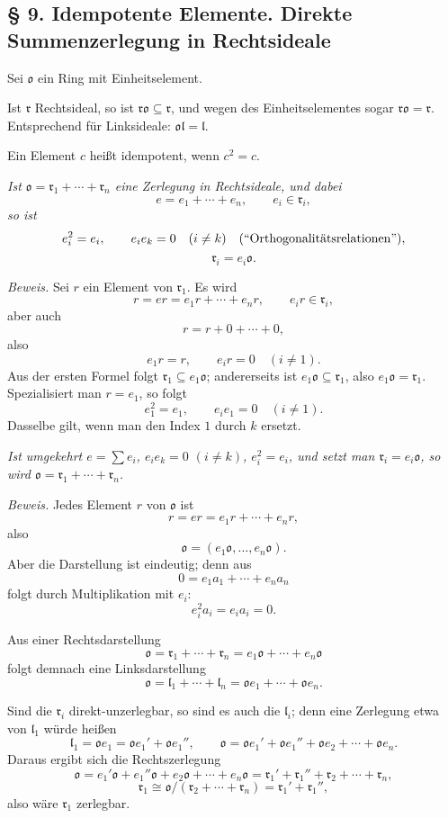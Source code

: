 \documentclass[11pt]{article}
\providecommand{\mo}{\mathfrak{o}}
\providecommand{\ml}{\mathfrak{l}}
\providecommand{\mr}{\mathfrak{r}}
\begin{document}
\subsection*{§ 9. Idempotente Elemente. Direkte Summenzerlegung in Rechtsideale}

Sei $\mo$ ein Ring mit Einheitselement.

Ist $\mr$ Rechtsideal, so ist $\mr\mo\subseteq\mr$, und wegen des Einheitselementes sogar $\mr\mo=\mr$. Entsprechend für Linksideale: $\mo\ml=\ml$.

Ein Element $c$ heißt idempotent, wenn $c^2=c$.

\emph{Ist $\mo=\mr_1+\cdots+\mr_n$ eine Zerlegung in Rechtsideale, und dabei}
\[
        e=e_1+\cdots+e_n,
        \qquad e_i\in\mr_i,
\]
\emph{so ist}
\[
        e_i^2=e_i,
        \qquad e_i e_k=0\quad(i\ne k)
        \quad\hbox{(``Orthogonalitätsrelationen'')},
\]
\[
        \mr_i=e_i\mo.
\]

\emph{Beweis.} Sei $r$ ein Element von $\mr_1$. Es wird
\[
        r=er=e_1r+\cdots+e_nr,
        \qquad e_ir\in\mr_i,
\]
aber auch
\[
        r=r+0+\cdots+0,
\]
also
\[
        e_1r=r,
        \qquad e_ir=0\quad(i\ne1).
\]
Aus der ersten Formel folgt $\mr_1\subseteq e_1\mo$; andererseits ist $e_1\mo\subseteq\mr_1$, also $e_1\mo=\mr_1$. Spezialisiert man $r=e_1$, so folgt
\[
        e_1^2=e_1,
        \qquad e_i e_1=0\quad(i\ne1).
\]
Dasselbe gilt, wenn man den Index $1$ durch $k$ ersetzt.

\emph{Ist umgekehrt $e=\sum e_i$, $e_i e_k=0$ $(i\ne k)$, $e_i^2=e_i$, und setzt man $\mr_i=e_i\mo$, so wird $\mo=\mr_1+\cdots+\mr_n$.}

\emph{Beweis.} Jedes Element $r$ von $\mo$ ist
\[
        r=er=e_1r+\cdots+e_nr,
\]
also
\[
        \mo=(e_1\mo,\ldots,e_n\mo).
\]
Aber die Darstellung ist eindeutig; denn aus
\[
        0=e_1a_1+\cdots+e_na_n
\]
folgt durch Multiplikation mit $e_i$:
\[
        e_i^2a_i=e_i a_i=0.
\]

Aus einer Rechtsdarstellung
\[
        \mo=\mr_1+\cdots+\mr_n=e_1\mo+\cdots+e_n\mo
\]
folgt demnach eine Linksdarstellung
\[
        \mo=\ml_1+\cdots+\ml_n=\mo e_1+\cdots+\mo e_n.
\]

Sind die $\mr_i$ direkt-unzerlegbar, so sind es auch die $\ml_i$; denn eine Zerlegung etwa von $\ml_1$ würde heißen
\[
        \ml_1=\mo e_1=\mo e_1'+\mo e_1'',
        \qquad
        \mo=\mo e_1'+\mo e_1''+\mo e_2+\cdots+\mo e_n.
\]
Daraus ergibt sich die Rechtszerlegung
\[
        \mo=e_1'\mo+e_1''\mo+e_2\mo+\cdots+e_n\mo
        =\mr_1'+\mr_1''+\mr_2+\cdots+\mr_n,
\]
\[
        \mr_1\cong \mo/(\mr_2+\cdots+\mr_n)=\mr_1'+\mr_1'',
\]
also wäre $\mr_1$ zerlegbar.
\end{document}
